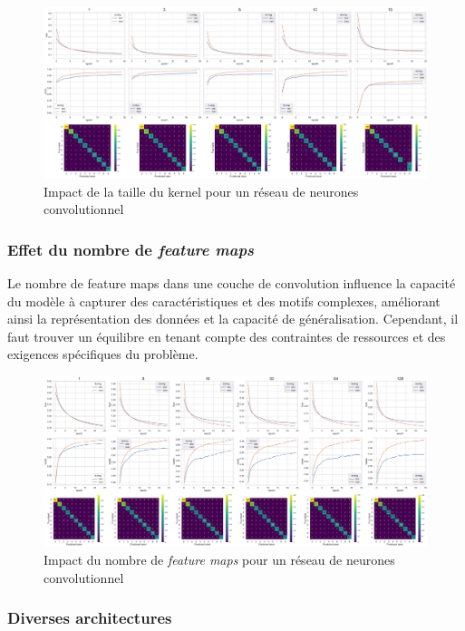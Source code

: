 \documentclass{article}
\begin{document}
\begin{figure}[htbp]
    \centering
    \includegraphics[width=\textwidth]{conv/conv_ksize.pdf}
    \caption{Impact de la taille du kernel pour un réseau de neurones convolutionnel}
    \label{fig:convksize}
\end{figure}

\subsubsection{Effet du nombre de \textit{feature maps}}

Le nombre de feature maps dans une couche de convolution influence la capacité du modèle à capturer des caractéristiques et des motifs complexes, améliorant ainsi la représentation des données et la capacité de généralisation. Cependant, il faut trouver un équilibre en tenant compte des contraintes de ressources et des exigences spécifiques du problème. 

\begin{figure}[htbp]
    \centering
    \includegraphics[width=\textwidth]{conv/conv_feature_maps.pdf}
    \caption{Impact du nombre de \textit{feature maps} pour un réseau de neurones convolutionnel}
    \label{fig:convchanout}
\end{figure}

\subsubsection{Diverses architectures}
\end{document}
